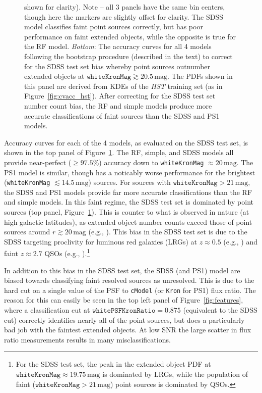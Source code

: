 \documentclass[twocolumn, dvipdfmx]{aastex62}
\begin{document}
\begin{CJK*}{UTF8}{gbsn}
\begin{figure}[htb]
{  shown for clarity). Note -- all 3 panels have the same bin centers, though
  here the markers are slightly offset for clarity. The SDSS model
  classifies faint point sources correctly, but has poor performance on
  faint extended objects, while the opposite is true for the RF model.
  \textit{Bottom}: The accuracy curves for all 4 models following the
  bootstrap procedure (described in the text) to correct for the SDSS test
  set bias whereby point sources outnumber extended objects at
  $\mathtt{whiteKronMag} \gtrsim 20.5\,\mathrm{mag}$. The PDFs shown in this
  panel are derived from KDEs of the \textit{HST} training set (as in
  Figure~\ref{fig:cvacc_hst}). After correcting for the SDSS test set number
  count bias, the RF and simple models produce more accurate classifications
  of faint sources than the SDSS and PS1 models.}
  \label{fig:acc_sdss}
\end{figure}

Accuracy curves for each of the 4 models, as evaluated on the SDSS test set,
is shown in the top panel of Figure~\ref{fig:acc_sdss}. The RF, simple, and
SDSS models all provide near-perfect ($\ge 97.5$\%) accuracy down to
\texttt{whiteKronMag} $\approx 20\,\mathrm{mag}$. The PS1 model is similar,
though has a noticably worse performance for the brightest
(\texttt{whiteKronMag} $\lesssim 14.5\,\mathrm{mag}$) sources. For sources
with $\mathtt{whiteKronMag} > 21\,\mathrm{mag}$, the SDSS and PS1 models
provide far more accurate classifications than the RF and simple models. In
this faint regime, the SDSS test set is dominated by point sources (top
panel, Figure~\ref{fig:acc_sdss}). This is counter to what is observed in
nature (at high galactic latitudes), as extended object number counts exceed
those of point sources around $r \gtrsim 20\,\mathrm{mag}$ (e.g.,
\citealt{Yasuda01,Shanks15}). This bias in the SDSS test set is due to the
SDSS targeting proclivity for luminous red galaxies (LRGs) at $z \approx
0.5$ (e.g., \citealt{Eisenstein01}) and faint $z \approx 2.7$ QSOs (e.g.,
\citealt{Ross12}).\footnote{For the SDSS test set, the peak in the extended
object PDF at $\mathtt{whiteKronMag} \approx 19.75\,\mathrm{mag}$ is
dominated by LRGs, while the population of faint ($\mathtt{whiteKronMag} >
21\,\mathrm{mag}$) point sources is dominated by QSOs.}

In addition to this bias in the SDSS test set, the SDSS (and PS1) model are
biased towards classifying faint resolved sources as unresolved. This is due
to the hard cut on a single value of the PSF to \texttt{cModel} (or
\texttt{Kron} for PS1) flux ratio. The reason for this can easily be seen in
the top left panel of Figure~\ref{fig:features}, where a classification cut
at $\mathtt{whitePSFKronRatio} = 0.875$ (equivalent to the SDSS cut)
correctly identifies nearly all of the point sources, but does a
particularly bad job with the faintest extended objects. At low SNR the
large scatter in flux ratio measurements results in many misclassifications.


\end{CJK*}
\end{document}
